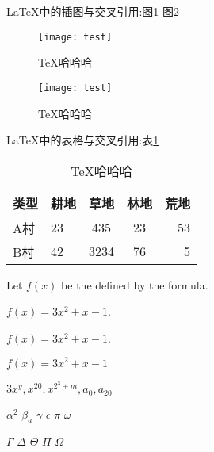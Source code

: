 \documentclass[12pt]{article} %
\begin{document}
	
	\LaTeX 中的插图与交叉引用:图\ref{fig-image} 图\ref{fig-image2}
	\begin{figure}[htbp]
		\centering %
		\texttt{[image: test]}
		\caption{\TeX 哈哈哈} \label{fig-image}
	\end{figure}

	\begin{figure}[htbp]
	\centering %
	\texttt{[image: test]}
	\caption{\TeX 哈哈哈} \label{fig-image2}
	\end{figure}



	\LaTeX 中的表格与交叉引用:表\ref{fig-tab}
	\begin{table}
		\centering %
		\begin{tabular}{|l||p{1.5cm}|c|c r|} %
			\hline	%
			类型 & 耕地 & 草地 & 林地 & 荒地 \\
			\hline \hline %
			A村 & 23 & 435 & 23 & 53 \\
			\hline
			B村 & 42 & 3234 & 76 & 5 \\
			\hline
		\end{tabular}
		\caption{\TeX 哈哈哈} \label{fig-tab}
	\end{table}
	
	
	
	Let $f(x)$ be the defined by the formula.
	
	$f(x)=3x^2+x-1$.
	
	\(f(x)=3x^2+x-1\).
	
	\begin{math}
		f(x)=3x^2+x-1
	\end{math}
	
	\begin{math}
	3x^y,x^{20},x^{2^3+m},a_0,a_{20}
	\end{math}
	
	$\alpha^2$
	$\beta_a$
	$\gamma$
	$\epsilon$
	$\pi$
	$\omega$
	
	$\Gamma$
	$\Delta$
	$\Theta$
	$\Pi$
	$\Omega$
	
\end{document}
